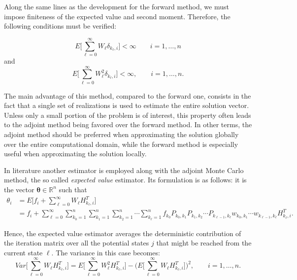 \documentclass[times]{nlaauth}
\begin{document}
Along the same lines as the development for the forward method, we must
impose finiteness of the expected value and second moment.
Therefore, the following
conditions must be verified:

\begin{equation}
 E\bigg[\sum_{\ell=0}^\infty W_{\ell}\delta_{k_{\ell},
i}\bigg]<\infty \qquad i=1,\ldots,n
\end{equation}
and
\begin{equation}
 E\bigg[\sum_{\ell=0}^\infty W_{\ell}^2
\delta_{k_{\ell},i}\bigg]<\infty, \qquad i=1,\ldots,n.
\end{equation}

The main advantage of this method, compared to the forward one, consists in the
fact that a single set of realizations is used to estimate the entire solution
vector.  Unless only a small portion of the problem is of interest, this
property often leads to the adjoint method being favored over the forward
method.
 In other terms, the adjoint method should be preferred when approximating
the solution globally over the entire computational domain, while the forward
method is especially useful when approximating the solution locally.

In literature another estimator is employed along with the adjoint Monte Carlo
method, the so called \textit{expected value} estimator. Its
formulation is as follows: it is the vector
$\boldsymbol{\theta}\in \mathbb{R}^n$ such that
\begin{equation}
\begin{array}{rl}
\theta_i & =E\bigg[f_i + \sum_{\ell=0}^\infty
W_{\ell}H_{k_{\ell}, i}^T\bigg]\\
&=f_i
+{\displaystyle \sum_{\ell=0}^{\infty}\sum_{k_0=1}^n\sum_{k_1=1}^n\sum_{k_2=1} ^n\cdots\sum_
{ k_ { \ell}=1}^n
f_{k_0}P_{k_0,k_1}P_{k_1,k_2}\cdots
P_{k_{\ell-1},k_{\ell}}w_{k_0,k_1}\cdots
w_{k_{\ell-1},k_{\ell}}H_{k_{\ell},i}^T.}
\label{adj_mean1}
\end{array}
\end{equation}

Hence, the expected value estimator averages
the deterministic contribution of the iteration matrix over all the potential
states $j$ that might be reached from the current state $\ell$. The variance
in this case becomes:
\begin{equation}
Var\bigg [\sum_{\ell=0}^\infty W_{\ell}
H_{k_{\ell},i}^T\bigg]=E\bigg[\sum_{\ell=0}^\infty W_{\ell}^2
{H_{k_{\ell},i}^T}\bigg ] - \bigg
(E\bigg[\sum_{\ell=0}^\infty
W_{\ell}
H_{k_{\ell},i}^T\bigg]\bigg )^2, \qquad i=1,\ldots,n
\label{adj_var1}.
\end{equation}
\end{document}
